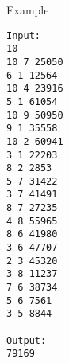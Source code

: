 Example
\begin{verbatim}
Input:
10
10 7 25050
6 1 12564
10 4 23916
5 1 61054
10 9 50950
9 1 35558
10 2 60941
3 1 22203
8 2 2853
5 7 31422
3 7 41491
8 7 27235
4 8 55965
8 6 41980
3 6 47707
2 3 45320
3 8 11237
7 6 38734
5 6 7561
3 5 8844

Output:
79169

\end{verbatim}